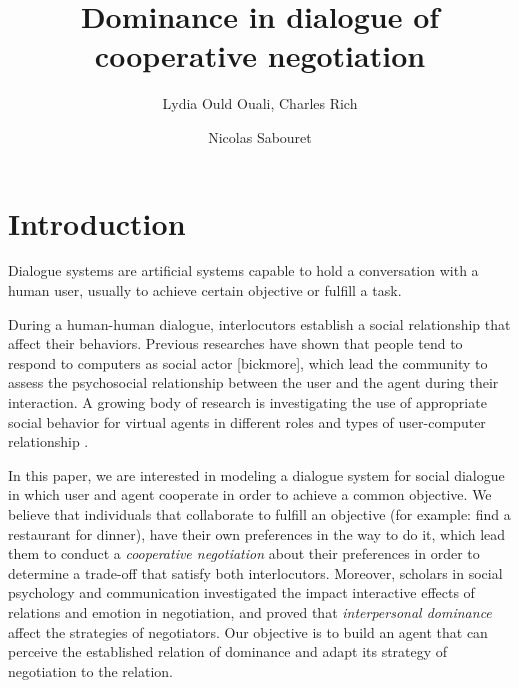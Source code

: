 \documentclass{llncs}
\begin{document}
	\title{\vskip -10pt Dominance in dialogue of cooperative negotiation}
	
	\author{Lydia Ould Ouali, Charles Rich \and
		Nicolas Sabouret }
	

	\maketitle
	\section{Introduction}
	Dialogue systems are artificial systems capable to hold a conversation with a human user, usually to achieve certain objective or fulfill a task.
	
	During a human-human dialogue, interlocutors establish a social relationship that affect their behaviors. Previous researches have shown that people tend to respond to computers as social actor [bickmore], which lead the community to assess the psychosocial relationship between the user and the agent during their interaction. 
	A growing body of research is investigating the use of appropriate social behavior for virtual agents in different roles and types of user-computer relationship \cite{bickmore2005s,bickmore2005establishing,kidd2005sociable}.
	
	
	In this paper, we are interested in modeling a dialogue system for social dialogue in which user and agent cooperate in order to achieve a common objective.  We believe that individuals that collaborate to fulfill an objective (for example: find a restaurant for dinner), have their own preferences in the way to do it, which lead them to conduct a \emph{cooperative negotiation} about their preferences in order to determine a trade-off that satisfy both interlocutors. Moreover, scholars in social psychology and communication investigated \cite{dunbar2005perceptions,de1995impact} the impact interactive effects of relations and emotion in negotiation, and proved that  \emph{interpersonal dominance} affect the strategies of negotiators. Our objective is to build an agent that can perceive the established relation of dominance and adapt its strategy of negotiation to the relation. 
	
\end{document}
